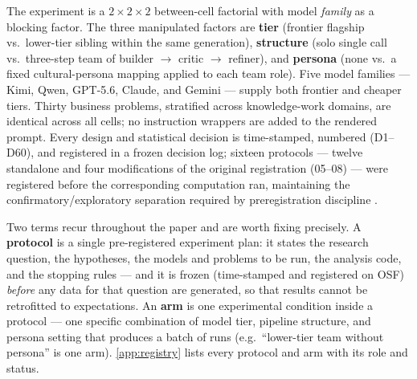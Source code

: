\documentclass[12pt,a4paper]{article}
\begin{document}
The experiment is a $2 \times 2 \times 2$ between-cell factorial with model
\emph{family} as a blocking factor. The three manipulated factors are
\textbf{tier} (frontier flagship vs.\ lower-tier sibling within the same
generation), \textbf{structure} (solo single call vs.\ three-step team of
builder $\to$ critic $\to$ refiner), and \textbf{persona} (none vs.\ a fixed
cultural-persona mapping applied to each team role). Five model families ---
Kimi, Qwen, GPT-5.6, Claude, and Gemini --- supply both frontier and cheaper
tiers. Thirty business problems, stratified across knowledge-work domains,
are identical across all cells; no instruction wrappers are added to the
rendered prompt. Every design and statistical decision is time-stamped, numbered
(D1--D60), and registered in a frozen decision log; sixteen protocols ---
twelve standalone and four modifications of the original registration (05--08)
--- were registered before the corresponding computation ran, maintaining
the confirmatory/exploratory separation required by preregistration discipline
\citep{NosekEtAl2018}.

Two terms recur throughout the paper and are worth fixing precisely. A
\textbf{protocol} is a single pre-registered experiment plan: it states the
research question, the hypotheses, the models and problems to be run, the
analysis code, and the stopping rules --- and it is frozen (time-stamped and
registered on OSF) \emph{before} any data for that question are generated, so
that results cannot be retrofitted to expectations. An \textbf{arm} is one
experimental condition inside a protocol --- one specific combination of model
tier, pipeline structure, and persona setting that produces a batch of runs
(e.g.\ ``lower-tier team without persona'' is one arm). \cref{app:registry}
lists every protocol and arm with its role and status.
\end{document}
